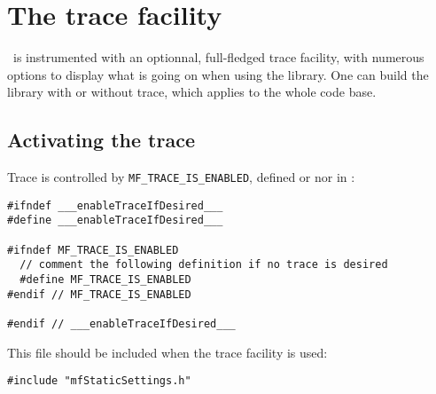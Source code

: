 



\chapter{The trace facility}


\mf\ is instrumented with an optionnal, full-fledged trace facility, with numerous options to display what is going on when using the library.
One can build the library with or without trace, which applies to the whole code base.

\section{Activating the trace}

Trace is controlled by {\tt MF_TRACE_IS_ENABLED}, defined or nor in :

\begin{lstlisting}[language=CPlusPlus]
#ifndef ___enableTraceIfDesired___
#define ___enableTraceIfDesired___

#ifndef MF_TRACE_IS_ENABLED
  // comment the following definition if no trace is desired
  #define MF_TRACE_IS_ENABLED
#endif // MF_TRACE_IS_ENABLED

#endif // ___enableTraceIfDesired___
\end{lstlisting}

This file should be included when the trace facility is used:
\begin{lstlisting}[language=CPlusPlus]
#include "mfStaticSettings.h"
\end{lstlisting}

